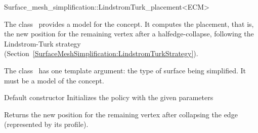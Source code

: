 

\begin{ccRefFunctionObjectClass}{Surface_mesh_simplification::LindstromTurk_placement<ECM>}


\ccDefinition

The class \ccRefName\ provides a model for the  concept. 
It computes the placement, that is, the new position for the remaining vertex after
a halfedge-collapse, following the Lindstrom-Turk strategy
(Section~\ref{SurfaceMeshSimplification:LindstromTurkStrategy}).

The class \ccRefName\ has one template argument: the type of surface being simplified. 
It must be a model of the  concept.


\ccIsModel
{}

\ccCreation
{}  %
{Default constructor} 
\ccGlue
{}
{Initializes the policy with the given parameters} 

  {Returns the new position for the remaining vertex after collapsing the edge
  (represented by its profile).}

\ccSeeAlso
{}\\
\\
\end{ccRefFunctionObjectClass}


